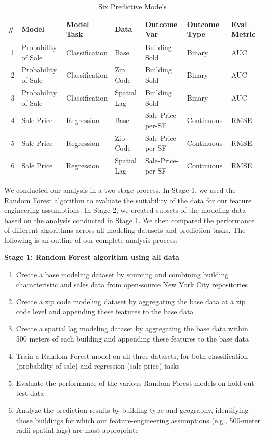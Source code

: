 \documentclass[conference,final,]{IEEEtran}
\providecommand{\tightlist}{%
  \setlength{\itemsep}{0pt}\setlength{\parskip}{0pt}}
\begin{document}
\begin{table}

\caption{\label{tab:model table}\label{tab:modeltable} Six Predictive Models}
\centering
\begin{tabular}[t]{r|l|l|l|l|l|l}
\hline
\# & Model & Model Task & Data & Outcome Var & Outcome Type & Eval Metric\\
\hline
1 & Probability of Sale & Classification & Base & Building Sold & Binary & AUC\\
\hline
2 & Probability of Sale & Classification & Zip Code & Building Sold & Binary & AUC\\
\hline
3 & Probability of Sale & Classification & Spatial Lag & Building Sold & Binary & AUC\\
\hline
4 & Sale Price & Regression & Base & Sale-Price-per-SF & Continuous & RMSE\\
\hline
5 & Sale Price & Regression & Zip Code & Sale-Price-per-SF & Continuous & RMSE\\
\hline
6 & Sale Price & Regression & Spatial Lag & Sale-Price-per-SF & Continuous & RMSE\\
\hline
\end{tabular}
\end{table}

We conducted our analysis in a two-stage process. In Stage 1, we used
the Random Forest algorithm to evaluate the suitability of the data for
our feature engineering assumptions. In Stage 2, we created subsets of
the modeling data based on the analysis conducted in Stage 1. We then
compared the performance of different algorithms across all modeling
datasets and prediction tasks. The following is an outline of our
complete analysis process:\newline

\noindent \textbf{Stage 1: Random Forest algorithm using all data}

\begin{enumerate}
\def\labelenumi{\arabic{enumi})}
\tightlist
\item
  Create a base modeling dataset by sourcing and combining building
  characteristic and sales data from open-source New York City
  repositories
\item
  Create a zip code modeling dataset by aggregating the base data at a
  zip code level and appending these features to the base data
\item
  Create a spatial lag modeling dataset by aggregating the base data
  within 500 meters of each building and appending these features to the
  base data
\item
  Train a Random Forest model on all three datasets, for both
  classification (probability of sale) and regression (sale price) tasks
\item
  Evaluate the performance of the various Random Forest models on
  hold-out test data
\item
  Analyze the prediction results by building type and geography,
  identifying those buildings for which our feature-engineering
  assumptions (e.g., 500-meter radii spatial lags) are most
  appropriate\newline
\end{enumerate}
\end{document}
